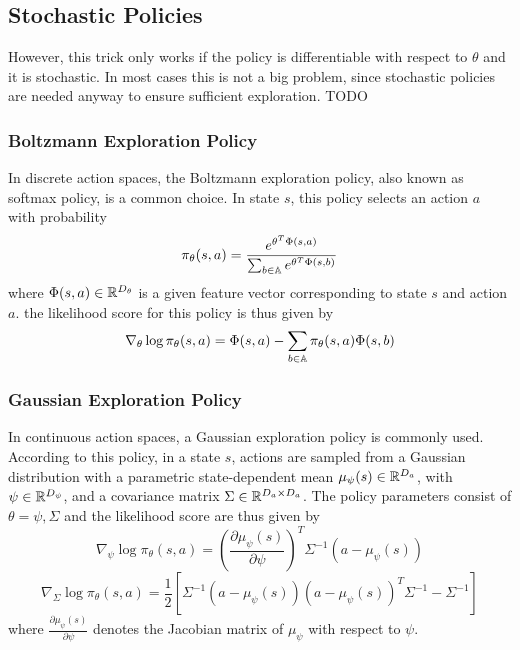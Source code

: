\subsection{Stochastic Policies}
However, this trick only works if the policy is differentiable with respect to $\theta$ and it is stochastic. In most cases this is not a big problem, since stochastic policies are needed anyway to ensure sufficient exploration.
TODO

\subsubsection{Boltzmann Exploration Policy}
In discrete action spaces, the Boltzmann exploration policy, also known as softmax policy, is a common choice. In state $s$, this policy selects an action $a$ with probability 
\begin{equation}
	\pi_\theta(s,a) = \frac{e^{\theta^T \Phi(s,a)}}{\sum_{b \in \mathbb{A}} e^{\theta^T \Phi(s,b)}}
\end{equation}    
where $\Phi(s,a) \in \mathbb{R}^{D_\theta}$ is a given feature vector corresponding to state $s$ and action $a$. the likelihood score for this policy is thus given by 
\begin{equation}
\nabla_\theta \log \pi_\theta(s,a) = \Phi(s,a) - \sum_{b\in\mathbb{A}} \pi_\theta(s,a) \Phi(s,b)
\end{equation}

\subsubsection{Gaussian Exploration Policy} 
In continuous action spaces, a Gaussian exploration policy is commonly used. According to this policy, in a state $s$, actions are sampled from a Gaussian distribution with a parametric state-dependent mean $\mu_\psi(s) \in \mathbb{R}^{D_a}$, with $\psi \in \mathbb{R}^{D_\psi}$, and a covariance matrix $\Sigma \in \mathbb{R}^{D_a \times D_a}$. The policy parameters consist of $\theta = {\psi, \Sigma}$ and the likelihood score are thus given by 
\begin{equation}
	\nabla_\psi \log \pi_\theta(s,a) = \left(\frac{\partial \mu_\psi(s)}{\partial \psi}\right)^T \Sigma^{-1} (a - \mu_\psi(s))
\end{equation}
\begin{equation}
	\nabla_\Sigma \log \pi_\theta(s,a) = \frac{1}{2}\left[\Sigma^{-1} \left(a - \mu_\psi(s)\right) \left(a - \mu_\psi(s)\right)^T \Sigma^{-1} - \Sigma^{-1}\right]
\end{equation}
where $\frac{\partial \mu_\psi(s)}{\partial \psi}$ denotes the Jacobian matrix of $\mu_\psi$ with respect to $\psi$.

